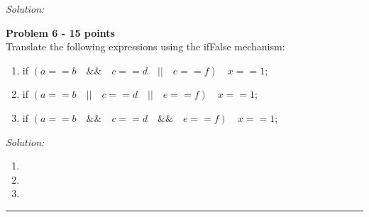 \documentclass[a4paper, 11pt]{article}
\newenvironment{problem}[2][Problem]
    { \begin{mdframed}[backgroundcolor=gray!20] \textbf{#1 #2} \\}
    {  \end{mdframed}}
\newenvironment{solution}
    {\textit{Solution:}}
    {}
\begin{document}
\begin{solution}

\end{solution} 


\begin{problem}{6 - 15 points}
Translate the following expressions using the ifFalse mechanism: 

\begin{enumerate}[a]
    \item if $(a==b \quad \&\& \quad c==d \quad || \quad e==f) \quad x == 1$;  
    \item if $(a==b \quad || \quad c==d \quad || \quad e==f) \quad x == 1$;  
    \item if $(a==b \quad \&\& \quad c==d \quad \&\& \quad e==f) \quad x == 1$; 
\end{enumerate}

\end{problem}

\begin{solution}
\begin{enumerate}[a]
    \item  
    \item 
    \item 
\end{enumerate}
\end{solution} 



\noindent\rule{7in}{2.8pt}
\end{document}
